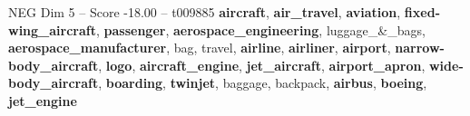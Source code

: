 \begin{textsample}{NEG Dim 5 – Score -18.00 – t009885}  \label{ex:f5_neg_018}
\textbf{aircraft}, \textbf{air\_travel}, \textbf{aviation}, \textbf{fixed-wing\_aircraft}, \textbf{passenger}, \textbf{aerospace\_engineering}, luggage\_\&\_bags, \textbf{aerospace\_manufacturer}, bag, travel, \textbf{airline}, \textbf{airliner}, \textbf{airport}, \textbf{narrow-body\_aircraft}, \textbf{logo}, \textbf{aircraft\_engine}, \textbf{jet\_aircraft}, \textbf{airport\_apron}, \textbf{wide-body\_aircraft}, \textbf{boarding}, \textbf{twinjet}, baggage, backpack, \textbf{airbus}, \textbf{boeing}, \textbf{jet\_engine}

\end{textsample}
